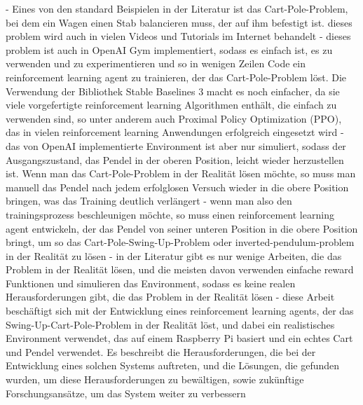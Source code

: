 - Eines von den standard Beispielen in der Literatur ist das Cart-Pole-Problem, bei dem ein Wagen einen Stab balancieren muss, der auf ihm befestigt ist. dieses problem wird auch in vielen Videos und Tutorials im Internet behandelt
- dieses problem ist auch in OpenAI Gym implementiert, sodass es einfach ist, es zu verwenden und zu experimentieren und so in wenigen Zeilen Code ein reinforcement learning agent zu trainieren, der das Cart-Pole-Problem löst. Die Verwendung der Bibliothek Stable Baselines 3 macht es noch einfacher, da sie viele vorgefertigte reinforcement learning Algorithmen enthält, die einfach zu verwenden sind, so unter anderem auch Proximal Policy Optimization (PPO), das in vielen reinforcement learning Anwendungen erfolgreich eingesetzt wird %
- das von OpenAI implementierte Environment ist aber nur simuliert, sodass der Ausgangszustand, das Pendel in der oberen Position, leicht wieder herzustellen ist. Wenn man das Cart-Pole-Problem in der Realität lösen möchte, so muss man manuell das Pendel nach jedem erfolglosen Versuch wieder in die obere Position bringen, was das Training deutlich verlängert
- wenn man also den trainingsprozess beschleunigen möchte, so muss einen reinforcement learning agent entwickeln, der das Pendel von seiner unteren Position in die obere Position bringt, um so das Cart-Pole-Swing-Up-Problem oder inverted-pendulum-problem in der Realität zu lösen
- in der Literatur gibt es nur wenige Arbeiten, die das Problem in der Realität lösen, und die meisten davon verwenden einfache reward Funktionen und simulieren das Environment, sodass es keine realen Herausforderungen gibt, die das Problem in der Realität lösen
- diese Arbeit beschäftigt sich mit der Entwicklung eines reinforcement learning agents, der das Swing-Up-Cart-Pole-Problem in der Realität löst, und dabei ein realistisches Environment verwendet, das auf einem Raspberry Pi basiert und ein echtes Cart und Pendel verwendet. Es beschreibt die Herausforderungen, die bei der Entwicklung eines solchen Systems auftreten, und die Lösungen, die gefunden wurden, um diese Herausforderungen zu bewältigen, sowie zukünftige Forschungsansätze, um das System weiter zu verbessern